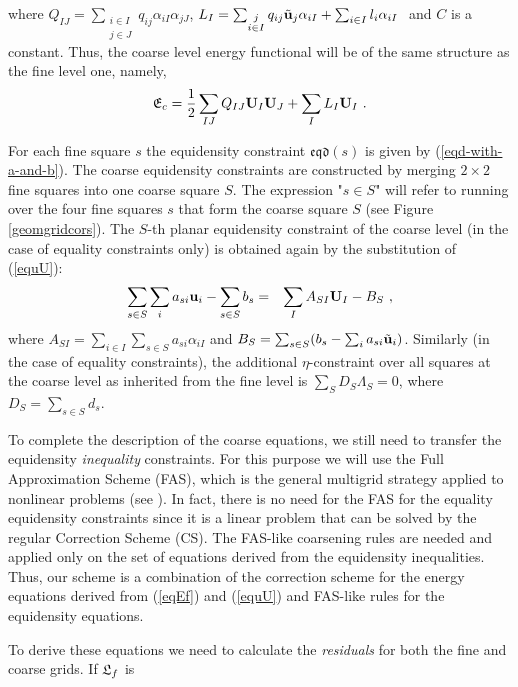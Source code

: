 \documentclass[final]{siamltex}
\begin{document}
where ${Q}_{IJ}=\sum_{\substack{i\in I\\ j\in
J}}{q}_{ij}\alpha_{iI}\alpha_{jJ}$,
$L_I=\sum_{\substack{j\\i\in I}}{q}_{ij} \tilde{{\bf u}}_j\alpha_{iI}+
\sum_{i\in I} l_i\alpha_{iI}~$ and $C$ is a constant. Thus, the coarse level energy
functional will be of the same structure as the fine level one,
namely,
\begin{equation*}
\mathfrak{E}_c = \frac{1}{2} \sum_{IJ} Q_{IJ}{\bf U}_I{\bf U}_J + \sum_{I}
L_I {\bf U}_I~.
\end{equation*}
\par For each fine square $s$ the equidensity constraint $\mathfrak{eqd}(s)$ is
given by (\ref{eqd-with-a-and-b}).
The coarse equidensity constraints are constructed by merging
$2\times 2$ fine squares into one coarse square $S$.
The expression "$s\in S$" will refer to running over the four fine
squares $s$ that form the coarse square $S$ (see Figure
\ref{geomgridcors}). The $S$-th planar equidensity constraint  of
the coarse level (in the case of equality constraints only) is
obtained again by the substitution of (\ref{equU}):
\begin{eqnarray*}
\sum_{s\in S}\sum_i a_{si}{\bf u}_i -\sum_{s\in S}b_s
& = & \sum_I A_{SI}{\bf U}_I - B_S~,
\end{eqnarray*}
where $A_{SI}=\sum_{i\in I}\sum_{s\in S} a_{si} \alpha_{iI}$ and
$B_S=\sum_{s\in S}(b_s-\sum_i a_{si}\tilde{{\bf u}}_i)$. Similarly (in
the case of equality constraints), the additional
$\eta$-constraint over all squares at the coarse level as
inherited from the fine level is $\sum_S D_S\Lambda_S=0$, where
$D_S=\sum_{s\in S}d_s$.
\par To complete the description of the coarse equations, we still need to transfer the equidensity {\it
inequality}
constraints.
For this purpose we will use the Full Approximation Scheme (FAS),
which is the general multigrid strategy applied to nonlinear
problems (see \cite{Brandt:1977:MLAa,vlsicad,mgbooktrott}). In
fact, there is no need for the FAS for the equality equidensity
constraints since it is a linear problem that can be solved by the
regular Correction Scheme (CS). The FAS-like coarsening rules are
needed and applied only on the set of equations derived from the
equidensity inequalities. Thus, our scheme is a combination of the
correction scheme for the energy equations derived from
(\ref{eqEf}) and (\ref{equU}) and FAS-like rules for the
equidensity equations.
\par To derive these equations we need to calculate the
{\it residuals} for both the fine and coarse grids. If $\mathfrak{L}_f$ is
\end{document}
